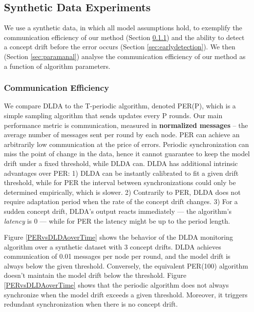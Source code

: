 \documentclass{sig-alternate-05-2015}
\begin{document}

\subsection{Synthetic Data Experiments}
We use a synthetic data, in which all model assumptions hold, to
exemplify the communication efficiency of our method (Section \ref{sec:com_eff}) and the ability to detect a concept drift before the error occurs (Section \ref{sec:earlydetection}). We then (Section \ref{sec:paramanal}) analyse the communication efficiency of our method as a function of algorithm parameters.

\subsubsection{Communication Efficiency}\label{sec:com_eff}
We compare DLDA to the T-periodic algorithm, denoted
PER(P), which is a simple sampling algorithm that sends updates
every P rounds.
Our main performance metric is communication, measured
in \textbf{normalized messages} -- the average number of messages sent per
round by each node. PER can achieve an arbitrarily low communication at the price of errors. Periodic synchronization can miss the point of change in the data, hence it cannot guarantee to keep the model drift under a fixed threshold, while DLDA can.  DLDA has additional intrinsic advantages over PER: 1) DLDA can be instantly calibrated to fit a given drift threshold, while for PER the interval between synchronizations could only be determined empirically, which is slower. 2) Contrarily to PER, DLDA does not require adaptation period when the rate of the concept drift changes. 3) For a sudden concept drift, DLDA's output reacts immediately --- the algorithm's \textit{latency} is 0 --- while for PER the latency might be up to the period length.
	
Figure \ref{PERvsDLDAoverTime} shows the behavior of the DLDA monitoring
algorithm over a synthetic dataset with 3 concept drifts.
DLDA achieves communication of 0.01 messages per node per round, and
the model drift is always below the given threshold.
Conversely, the equivalent PER(100) algorithm doesn't maintain the
model drift below the threshold.
Figure \ref{PERvsDLDAoverTime} shows that the periodic algorithm does not always  synchronize when the model drift exceeds a given threshold. Moreover, it  triggers redundant synchronization when there is no concept drift.
\end{document}
